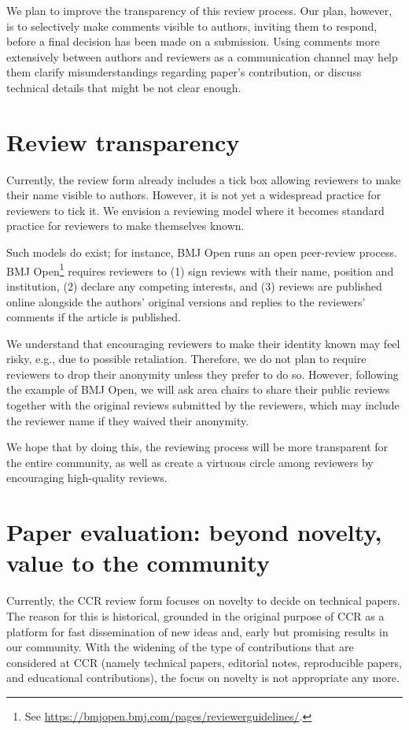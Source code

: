 \documentclass[sigconf]{acmart}
\begin{document}
We plan to improve the transparency of this review process.  Our plan, however, is to selectively make comments visible to authors, inviting them to respond, before a final decision has been made on a submission.  Using comments more extensively between authors and reviewers as a communication channel may help them clarify misunderstandings regarding paper's contribution, or discuss technical details that might be not clear enough. 

\section{Review transparency}
\label{sec:anonymity}

Currently, the review form already includes a tick box allowing reviewers to make their name visible to authors. However, it is not yet a widespread practice for reviewers to tick it. We envision a reviewing model where it becomes standard practice for reviewers to make themselves known.

Such models do exist; for instance, BMJ Open runs an open peer-review process. BMJ Open\footnote{See \url{https://bmjopen.bmj.com/pages/reviewerguidelines/}.} requires reviewers to (1) sign reviews with their name, position and institution, (2) declare any competing interests, and (3) reviews are published online alongside the authors' original versions and replies to the reviewers' comments if the article is published.

We understand that encouraging reviewers to make their identity known may feel risky, e.g., due to possible retaliation. Therefore, we do not plan to require reviewers to drop their anonymity unless they prefer to do so. However, following the example of BMJ Open,  we will ask area chairs to share their public reviews together with the original reviews submitted by the reviewers, which may include the reviewer name if they waived their anonymity.

We hope that by doing this, the reviewing process will be more transparent for the entire community, as well as create a virtuous circle among reviewers by encouraging high-quality reviews.

\section{Paper evaluation: beyond novelty, value to the community}
\label{sec:value}

Currently, the CCR review form focuses on novelty to decide on technical
papers. The reason for this is historical, grounded in the original purpose of CCR as a platform for fast dissemination of new ideas and, early but promising results in our community. With the widening of the type of contributions that are considered at CCR (namely technical papers, editorial notes, reproducible papers, and educational contributions), the focus on novelty is not appropriate any more. 
\end{document}

